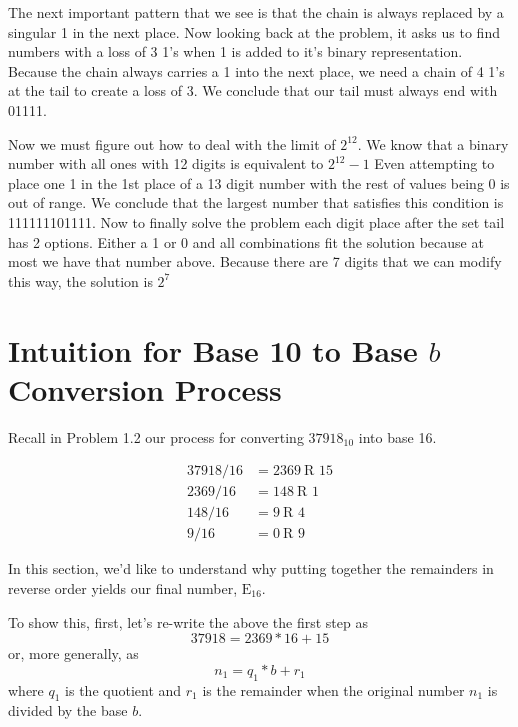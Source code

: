 \documentclass{pset_template}
\begin{document}
\begin{enumerate}
The next important pattern that we see is that the chain is always replaced by a singular 1 in the next place. Now looking back at the problem, it asks us to find numbers with a loss of 3 1's when 1 is added to it's binary representation. Because the chain always carries a 1 into the next place, we need a chain of 4 1's at the tail to create a loss of 3. We conclude that our tail must always end with 01111.

Now we must figure out how to deal with the limit of $2^{12}$. We know that a binary number with all ones with 12 digits is equivalent to $2^{12} - 1$ Even attempting to place one 1 in the 1st place of a 13 digit number with the rest of values being 0 is out of range. We conclude that the largest number that satisfies this condition is 111111101111. Now to finally solve the problem each digit place after the set tail has 2 options. Either a 1 or 0 and all combinations fit the solution because at most we have that number above. Because there are 7 digits that we can modify this way, the solution is $2^7$ 

\end{enumerate}

\appendix

\section{Intuition for Base 10 to Base $b$ Conversion Process}
Recall in Problem 1.2 our process for converting $37918_{10}$ into base 16.

\begin{align*}
37918/16 &= 2369~\text{R 15}\\
2369/16 &= 148~\text{R 1}\\
148/16 &= 9~\text{R 4}\\
9/16 &= 0~\text{R 9}
\end{align*}

In this section, we'd like to understand why putting together the remainders in reverse order yields our final number, $\text{E}_{16}$.

To show this, first, let's re-write the above the first step as
\begin{equation*}
37918 = 2369 * 16 + 15
\end{equation*}
or, more generally, as
\begin{equation}
\label{general_divison}
n_1 = q_1 * b + r_1
\end{equation}
where $q_1$ is the quotient and $r_1$ is the remainder when the original number $n_1$ is divided by the base $b$.
\end{document}
